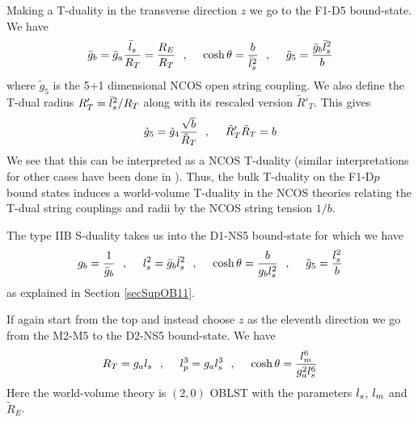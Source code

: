 \documentclass[a4paper,twoside,titlepage,12pt]{article}
\begin{document}
Making a T-duality in the transverse direction $z$ we go to the
F1-D5 bound-state. We have
%
\begin{equation}
\bar{g}_b = \bar{g}_a \frac{\bar{l}_s}{R_T} = \frac{R_E}{R_T} \ \ ,\ \ \ \ 
\cosh \theta = \frac{b}{\bar{l}_s^2} \ \ ,\ \ \ \  
\tilde{g}_5 = \frac{\bar{g}_b \bar{l}_s^2}{b}
\end{equation}
%
where \( \tilde{g}_5 \) is the 5+1 dimensional NCOS open string coupling.
We also define the T-dual radius \( R'_T = \bar{l}_s^2 / R_T \) along with
its rescaled version \( \tilde{R}'_T \).
This gives 
%
\begin{equation}
\label{NCOSTdual}
\tilde{g}_5 = \tilde{g}_4 \frac{\sqrt{b}}{\tilde{R}_T} \ \ ,\ \ \ \ 
\tilde{R}'_T \tilde{R}_T = b
\end{equation}
%
We see that this can be interpreted as a NCOS T-duality (similar
interpretations for other cases have been done in 
\cite{Bergshoeff:2000ai,Kawano:2000gn}).
Thus, the bulk T-duality on the F1-D$p$ bound states induces 
a world-volume T-duality in the NCOS theories relating the
T-dual string couplings and radii by the NCOS string tension $1/b$.

The type IIB S-duality takes us into the D1-NS5 bound-state
for which we have
%
\begin{equation}
\label{D1NS5results}
g_b = \frac{1}{\bar{g}_b} \ \ ,\ \ \ \ 
l_s^2 = \bar{g}_b \bar{l}_s^2 \ \ ,\ \ \ \ 
\cosh \theta = \frac{b}{g_b l_s^2} \ \ ,\ \ \ \ 
\tilde{g}_5 = \frac{l_s^2}{b}
\end{equation}
%
as explained in Section \ref{secSupOB11}.

If again start from the top and instead choose $z$ as the eleventh direction 
we go from the M2-M5 to the D2-NS5 bound-state. We have
%
\begin{equation}
R_T = g_a l_s \ \ ,\ \ \ \ 
l_p^3 = g_a l_s^3 \ \ ,\ \ \ \ 
\cosh \theta = \frac{l_m^6}{g_a^2 l_s^6}
\end{equation}
%
Here the world-volume theory is $(2,0)$ OBLST with the parameters
$l_s$, $l_m$ and $\tilde{R}_E$.
\end{document}
